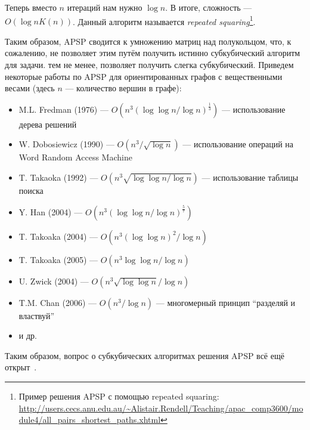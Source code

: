 Теперь вместо $n$ итераций нам нужно $\log{n}$. В итоге, сложность --- $O(\log{n} K(n))$.
Данный алгоритм называется \textit{repeated squaring}\footnote{Пример решения APSP с помощью repeated squaring: \url{http://users.cecs.anu.edu.au/~Alistair.Rendell/Teaching/apac_comp3600/module4/all_pairs_shortest_paths.xhtml}}.


Таким образом, APSP сводится к умножению матриц над полукольцом, что, к сожалению, не позволяет этим путём получить истинно субкубический алгоритм для задачи. тем не менее, позволяет получить слегка субкубический. Приведем некоторые работы по APSP для ориентированных графов с вещественными весами (здесь $n$ --- количество вершин в графе):
\begin{itemize}
    \item M.L. Fredman (1976) --- $O(n^3(\log \log n / \log n)^\frac{1}{3})$ --- использование дерева решений~\cite{FredmanAPSP1976}
    \item W. Dobosiewicz (1990) --- $O(n^3 / \sqrt{\log n})$ --- использование операций на Word Random Access Machine~\cite{Dobosiewicz1990}
    \item T. Takaoka (1992) --- $O(n^3 \sqrt{\log \log n / \log n})$ --- использование таблицы поиска~\cite{Takaoka1992}
    \item Y. Han (2004) --- $O(n^3 (\log \log n / \log n)^\frac{5}{7})$~\cite{Han2004}
    \item T. Takoaka (2004) --- $O(n^3 (\log \log n)^2 / \log n)$~\cite{Takaoka2004}
    \item T. Takoaka (2005) --- $O(n^3 \log \log n / \log n)$~\cite{Takaoka2005}
    \item U. Zwick (2004) --- $O(n^3 \sqrt{\log \log n} / \log n)$~\cite{Zwick2004}
    \item T.M. Chan (2006) --- $O(n^3 / \log n)$ --- многомерный принцип ``разделяй и властвуй''~\cite{Chan2008}
    \item и др.
\end{itemize}

Таким образом, вопрос о субкубических алгоритмах решения APSP всё ещё открыт~\cite{Chan2010}.





